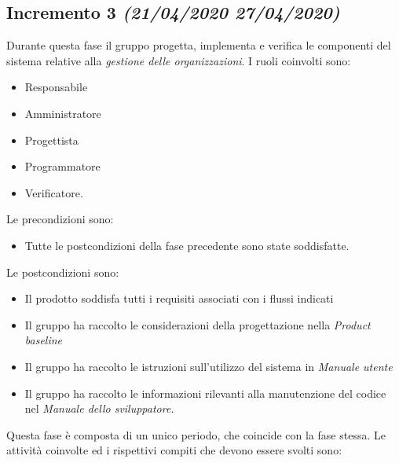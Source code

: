 \documentclass[../piano-di-progetto.tex]{subfiles}
\begin{document}
\subsection[Incremento 3]{Incremento 3 {\normalsize\normalfont\itshape(21/04/2020  27/04/2020)}}%
\label{sub:incremento_3}
Durante questa fase il gruppo progetta, implementa e verifica le componenti del sistema relative alla \textit{gestione delle organizzazioni}.
I ruoli coinvolti sono:
\begin{itemize}
  \item Responsabile
  \item Amministratore
  \item Progettista
  \item Programmatore
  \item Verificatore.
\end{itemize}
Le precondizioni sono:
\begin{itemize}
  \item Tutte le postcondizioni della fase precedente sono state soddisfatte.
\end{itemize}
Le postcondizioni sono:
\begin{itemize}
  \item Il prodotto soddisfa tutti i requisiti associati con i flussi indicati
  \item Il gruppo ha raccolto le considerazioni della progettazione nella \textit{Product baseline}
  \item Il gruppo ha raccolto le istruzioni sull'utilizzo del sistema in \textit{Manuale utente}
  \item Il gruppo ha raccolto le informazioni rilevanti alla manutenzione del codice nel \textit{Manuale dello sviluppatore}.
\end{itemize}
Questa fase è composta di un unico periodo, che coincide con la fase stessa.
Le attività coinvolte ed i rispettivi compiti che devono essere svolti sono:
\end{document}

